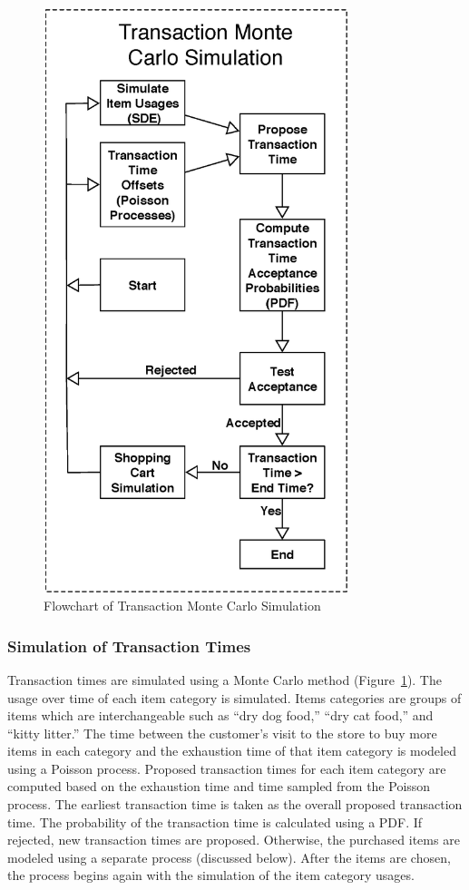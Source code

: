 \documentclass[conference]{IEEEtran}
\begin{document}
\begin{figure}[!t]
  \centering
  \includegraphics[width=3.5in]{figures/transaction_simulation.eps}
  \caption{Flowchart of Transaction Monte Carlo Simulation}
  \label{fig:trans_sim}
\end{figure}

\subsubsection{Simulation of Transaction Times} \label{sec:transaction-times}
Transaction times are simulated using a Monte Carlo method (Figure~\ref{fig:trans_sim}).  The usage over time of each item category is simulated. Items categories are groups of items which are interchangeable such as ``dry dog food,'' ``dry cat food,'' and ``kitty litter.'' The time between the customer's visit to the store to buy more items in each category and the exhaustion time of that item category is modeled using a Poisson process. Proposed transaction times for each item category are computed based on the exhaustion time and time sampled from the Poisson process. The earliest transaction time is taken as the overall proposed transaction time.  The probability of the transaction time is calculated using a PDF.  If rejected, new transaction times are proposed.  Otherwise, the purchased items are modeled using a separate process (discussed below). After the items are chosen, the process begins again with the simulation of the item category usages.
\end{document}
